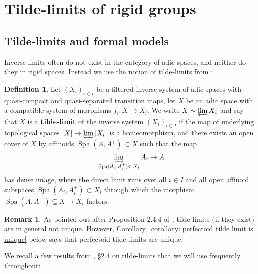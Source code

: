 \documentclass[10pt,oneside]{amsart}
\theoremstyle{definition}
\newtheorem{definition}[theorem]{Definition}
\newtheorem{remark}[theorem]{Remark}
\begin{document}
	\section{Tilde-limits of rigid groups} \label{section:tilde_limit}
  
	

		\subsection{Tilde-limits and formal models} 
		
	Inverse limits often do not exist in the category of adic spaces, and neither do they in rigid spaces. Instead we use the notion of tilde-limits from \cite{SW}:
	
	\begin{definition} 
Let $(X_i)_{i\in I}$ be a filtered inverse system of adic spaces with quasi-compact and quasi-separated transition maps, let $X$ be an adic space with a compatible system of morphisms $f_i: X \rightarrow X_i$. We write $X \sim \varprojlim X_i$ and say that $X$ is a \textbf{tilde-limit} of the inverse system $(X_i)_{i\in I}$ if the map of underlying topological spaces $|X| \rightarrow \varprojlim |X_i|$ is a homeomorphism, and there exists an open cover of $X$ by affinoids $\operatorname{Spa} (A, A^+) \subset X$ such that the map 
$$ \varinjlim_{\operatorname{Spa}(A_i, A_i^+) \subset X_i} A_i \rightarrow A$$
has dense image, where the direct limit runs over all $i\in I$ and all open affinoid subspaces $\operatorname{Spa}(A_i, A_i^+) \subset X_i$ through which the morphism $\operatorname{Spa}(A, A^+) \subseteq X\rightarrow X_i$ factors.
	\end{definition}
	
	\begin{remark} \label{remark:tilde_limit_non_unique}
As pointed out after Proposition 2.4.4 of \cite{SW}, tilde-limits (if they exist) are in general not unique. However, Corollary~\ref{corollary: perfectoid tilde limit is unique} below says that perfectoid tilde-limits are unique.
	\end{remark}

We recall a few results from \cite{SW}, \S2.4 on tilde-limits that we will use frequently throughout:
\end{document}
